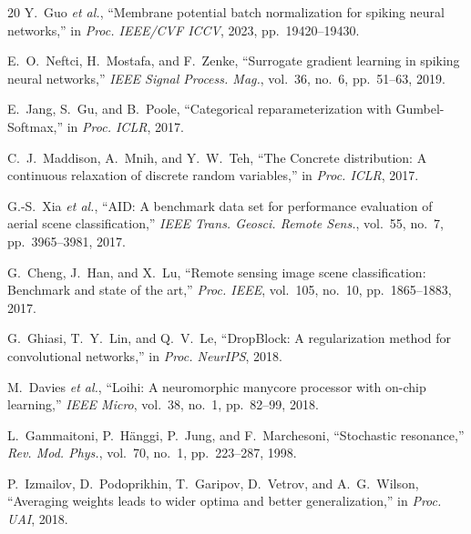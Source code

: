 \documentclass[conference]{IEEEtran}
\begin{document}
\begin{thebibliography}{20}
Y.~Guo \emph{et al.}, ``Membrane potential batch normalization for spiking neural networks,'' in \emph{Proc. IEEE/CVF ICCV}, 2023, pp.~19420--19430.

E.~O.~Neftci, H.~Mostafa, and F.~Zenke, ``Surrogate gradient learning in spiking neural networks,'' \emph{IEEE Signal Process. Mag.}, vol.~36, no.~6, pp.~51--63, 2019.

E.~Jang, S.~Gu, and B.~Poole, ``Categorical reparameterization with Gumbel-Softmax,'' in \emph{Proc. ICLR}, 2017.

C.~J.~Maddison, A.~Mnih, and Y.~W.~Teh, ``The Concrete distribution: A continuous relaxation of discrete random variables,'' in \emph{Proc. ICLR}, 2017.

G.-S.~Xia \emph{et al.}, ``AID: A benchmark data set for performance evaluation of aerial scene classification,'' \emph{IEEE Trans. Geosci. Remote Sens.}, vol.~55, no.~7, pp.~3965--3981, 2017.

G.~Cheng, J.~Han, and X.~Lu, ``Remote sensing image scene classification: Benchmark and state of the art,'' \emph{Proc. IEEE}, vol.~105, no.~10, pp.~1865--1883, 2017.

G.~Ghiasi, T.~Y.~Lin, and Q.~V.~Le, ``DropBlock: A regularization method for convolutional networks,'' in \emph{Proc. NeurIPS}, 2018.

M.~Davies \emph{et al.}, ``Loihi: A neuromorphic manycore processor with on-chip learning,'' \emph{IEEE Micro}, vol.~38, no.~1, pp.~82--99, 2018.


L.~Gammaitoni, P.~H\"{a}nggi, P.~Jung, and F.~Marchesoni, ``Stochastic resonance,'' \emph{Rev. Mod. Phys.}, vol.~70, no.~1, pp.~223--287, 1998.

P.~Izmailov, D.~Podoprikhin, T.~Garipov, D.~Vetrov, and A.~G.~Wilson, ``Averaging weights leads to wider optima and better generalization,'' in \emph{Proc. UAI}, 2018.

\end{thebibliography}
\end{document}
